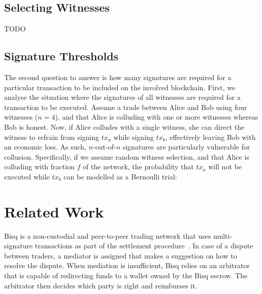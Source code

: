 \documentclass{article}
\begin{document}
\subsection{Selecting Witnesses}
TODO

\subsection{Signature Thresholds}
The second question to answer is how many signatures are required for a particular transaction to be included on the involved blockchain.
First, we analyse the situation where the signatures of all witnesses are required for a transaction to be executed.
Assume a trade between Alice and Bob using four witnesses ($ n = 4 $), and that Alice is colluding with one or more witnesses whereas Bob is honest.
Now, if Alice colludes with a single witness, she can direct the witness to refrain from signing $ tx_a $ while signing $ tx_b $, effectively leaving Bob with an economic loss.
As such, $n$-out-of-$n$ signatures are particularly vulnerable for collusion.
Specifically, if we assume random witness selection, and that Alice is colluding with fraction $ f $ of the network, the probability that $ tx_a $ will not be executed while $ tx_b $ can be modelled as a Bernoulli trial:


\section{Related Work}
Bisq is a non-custodial and peer-to-peer trading network that uses multi-signature transactions as part of the settlement procedure~\cite{bisq}.
In case of a dispute between traders, a mediator is assigned that makes a suggestion on how to resolve the dispute.
When mediation is insufficient, Bisq relies on an arbitrator that is capable of redirecting funds to a wallet owned by the Bisq escrow.
The arbitrator then decides which party is right and reimburses it.



\end{document}
